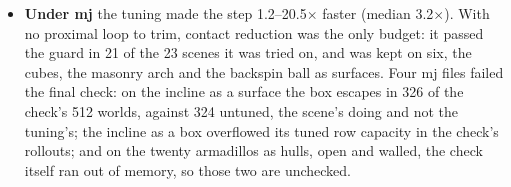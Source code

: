\begin{itemize}
\item \textbf{Under mj} the tuning made the step 1.2--20.5$\times$ faster (median 3.2$\times$). With no proximal loop to trim, contact reduction was the only budget: it passed the guard in 21 of the 23 scenes it was tried on, and was kept on six, the cubes, the masonry arch and the backspin ball as surfaces. Four mj files failed the final check: on the incline as a surface the box escapes in 326 of the check's 512 worlds, against 324 untuned, the scene's doing and not the tuning's; the incline as a box overflowed its tuned row capacity in the check's rollouts; and on the twenty armadillos as hulls, open and walled, the check itself ran out of memory, so those two are unchecked.
\end{itemize}
